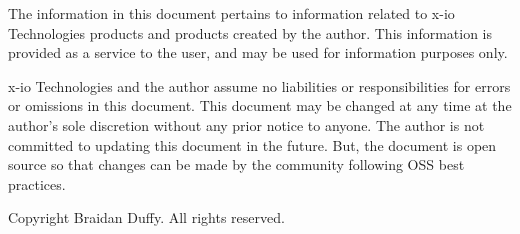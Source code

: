 
The information in this document pertains to information related to x-io Technologies products and products created by the author.  
This information is provided as a service to the user, and may be used for information purposes only.

x-io Technologies and the author assume no liabilities or responsibilities for errors or omissions in this document.  
This document may be changed at any time at the author's sole discretion without any prior notice to anyone.  
The author is not committed to updating this document in the future.
But, the document is open source so that changes can be made by the community following OSS best practices.

Copyright \textcopyright{} \the\year{} Braidan Duffy.  All rights reserved.
